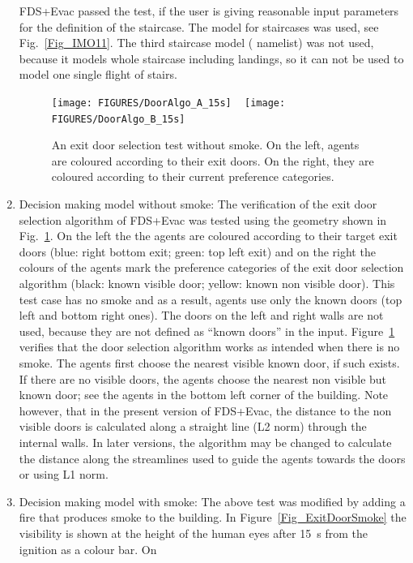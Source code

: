 \documentclass[12pt,a4paper,final,twoside]{stylevk}
\begin{document}
\begin{enumerate}
  FDS+Evac passed the test, if the user is giving reasonable input
  parameters for the definition of the staircase.  The 
  model for staircases was used, see Fig.~\ref{Fig_IMO11}.  The third
  staircase model ( namelist) was not used, because it
  models whole staircase including landings, so it can not be used to
  model one single flight of stairs.
%
\begin{figure}[!tb]
  \centerline{\texttt{[image: FIGURES/DoorAlgo\_A\_15s]} ~ \texttt{[image: FIGURES/DoorAlgo\_B\_15s]}} 
  \caption{An exit door selection test without
    smoke.  On the left, agents are coloured according to their exit
    doors. On the right, they are coloured according to their current
    preference categories.}\label{Fig_ExitDoorNoSmoke}
\end{figure}
%
%
\item Decision making model without smoke: The verification of the
  exit door selection algorithm of FDS+Evac was tested using the
  geometry shown in Fig.~\ref{Fig_ExitDoorNoSmoke}.  On the left the
  the agents are coloured according to their target exit doors (blue:
  right bottom exit; green: top left exit) and on the right the
  colours of the agents mark the preference categories of the exit
  door selection algorithm (black: known visible door; yellow: known
  non visible door).  This test case has no smoke and as a result,
  agents use only the known doors (top left and bottom right ones).
  The doors on the left and right walls are not used, because they are
  not defined as ``known doors'' in the input.
  Figure~\ref{Fig_ExitDoorNoSmoke} verifies that the door selection
  algorithm works as intended when there is no smoke.  The agents
  first choose the nearest visible known door, if such exists.  If
  there are no visible doors, the agents choose the nearest non
  visible but known door; see the agents in the bottom left corner of
  the building.  Note however, that in the present version of
  FDS+Evac, the distance to the non visible doors is calculated along
  a straight line (L2 norm) through the internal walls.  In later
  versions, the algorithm may be changed to calculate the distance
  along the streamlines used to guide the agents towards the doors or
  using L1 norm.
%
\item Decision making model with smoke: The above test was modified by
  adding a fire that produces smoke to the building.  In
  Figure~\ref{Fig_ExitDoorSmoke} the visibility is shown at the height
  of the human eyes after 15~s from the ignition as a colour bar.  On

\end{enumerate}
\end{document}
